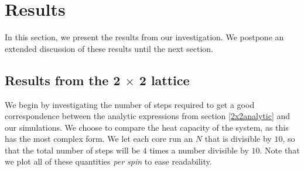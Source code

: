 \documentclass[a4paper, 10pt]{article}
\begin{document}
\section{Results}
In this section, we present the results from our investigation. We postpone an extended discussion of these results until the next section.
\subsection{Results from the 2 $\times$ 2 lattice}
We begin by investigating the number of steps required to get a good correspondence between the analytic expressions from section \ref{2x2analytic} and our simulations. We choose to compare the heat capacity of the system, as this has the most complex form. We let each core run an $N$ that is divisible by $10$, so that the total number of steps will be $4$ times a number divisible by $10$. Note that we plot all of these quantities \textit{per spin} to ease readability.\\
\end{document}
